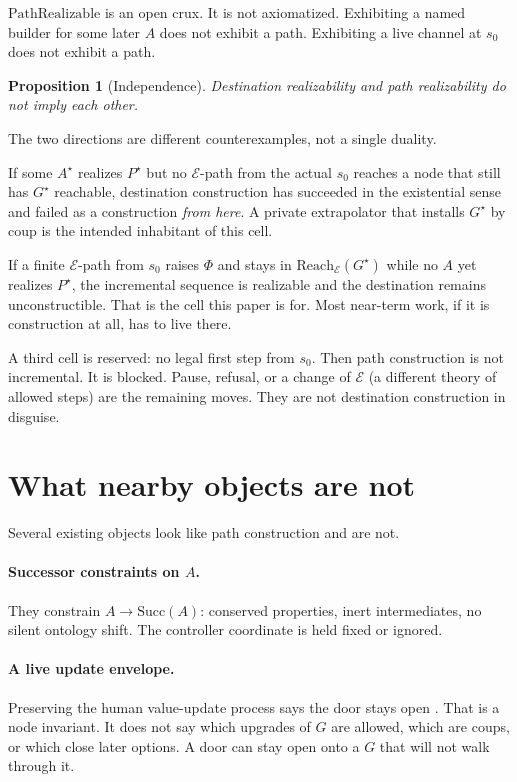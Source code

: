 \documentclass[11pt]{article}
\newtheorem{proposition}{Proposition}
\newcommand{\Eset}{\mathcal{E}}
\newcommand{\Reach}{\mathrm{Reach}}
\begin{document}
\(\mathrm{PathRealizable}\) is an open crux.
It is not axiomatized.
Exhibiting a named builder for some later \(A\) does not exhibit a path.
Exhibiting a live channel at \(s_0\) does not exhibit a path.

\begin{proposition}[Independence]
\label{prop:indep}
Destination realizability and path realizability do not imply each other.
\end{proposition}

The two directions are different counterexamples, not a single duality.

If some \(A^\star\) realizes \(P^\star\) but no \(\Eset\)-path from the actual \(s_0\) reaches a node that still has \(G^\star\) reachable, destination construction has succeeded in the existential sense and failed as a construction \emph{from here}.
A private extrapolator that installs \(G^\star\) by coup is the intended inhabitant of this cell.

If a finite \(\Eset\)-path from \(s_0\) raises \(\Phi\) and stays in \(\Reach_{\Eset}(G^\star)\) while no \(A\) yet realizes \(P^\star\), the incremental sequence is realizable and the destination remains unconstructible.
That is the cell this paper is for.
Most near-term work, if it is construction at all, has to live there.

A third cell is reserved: no legal first step from \(s_0\).
Then path construction is not incremental.
It is blocked.
Pause, refusal, or a change of \(\Eset\) (a different theory of allowed steps) are the remaining moves.
They are not destination construction in disguise.

\section{What nearby objects are not}

Several existing objects look like path construction and are not.

\paragraph{Successor constraints on \(A\).}
They constrain \(A\to\mathrm{Succ}(A)\): conserved properties, inert intermediates, no silent ontology shift.
The controller coordinate is held fixed or ignored.

\paragraph{A live update envelope.}
Preserving the human value-update process says the door stays open \parencite{christiano2018corrigibility}.
That is a node invariant.
It does not say which upgrades of \(G\) are allowed, which are coups, or which close later options.
A door can stay open onto a \(G\) that will not walk through it.
\end{document}

